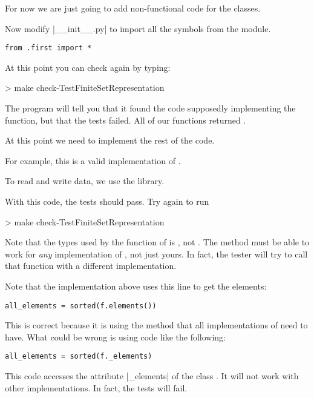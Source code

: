 For now we are just going to add non-functional code for the classes.


Now modify \files|__init__.py| to import all the symbols from the  module.

\begin{verbatim}
from .first import *
\end{verbatim}

At this point you can check again by typing:

\begin{console}
  > make check-TestFiniteSetRepresentation
\end{console}

The program will tell you that it found the code supposedly implementing the function,
but that the tests failed. All of our functions returned .

At this point we need to implement the rest of the code.

For example, this is a valid implementation of .



To read and write data, we use the  library.


With this code, the tests should pass. Try again to run

\begin{console}
  > make check-TestFiniteSetRepresentation
\end{console}

Note that the types used by the function  of  is ,
not . The method must be able to work for \emph{any} implementation of  ,
not just yours. In fact, the tester will try to call that function with a different implementation.

Note that the implementation above uses this line to get the elements:
\begin{verbatim}
all_elements = sorted(f.elements())
\end{verbatim}
This is correct because it is using the method  that all implementations of  
need to have. What could be wrong is using code like the following:
\begin{verbatim}
all_elements = sorted(f._elements)
\end{verbatim}
This code accesses the attribute \pystr|_elements| of the class .
It will not work with other implementations. In fact, the tests will fail.
